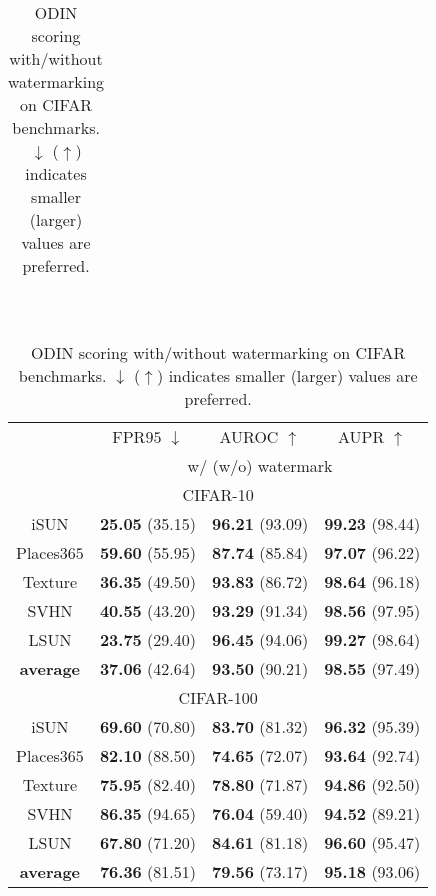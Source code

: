 \documentclass{article}
\begin{document}
\begin{table}[t]
{{\begin{tabular}{c|ccc}
\end{tabular}
}}~~~~
\parbox{.47\linewidth}{
\centering
\caption{ODIN scoring with/without watermarking on CIFAR benchmarks. $\downarrow$ ($\uparrow$) indicates smaller (larger) values are preferred.} \label{tab: odin}
\vspace{5pt}
\scriptsize{
\begin{tabular}{c|ccc}
\toprule[1.5pt]
                   & FPR$95$ $\downarrow$     & AUROC $\uparrow$       & AUPR $\uparrow$      \\
                   \cline{2-4} 
\multirow{-2}{*}{} & \multicolumn{3}{c}{w/ (w/o) watermark} \\
\midrule[0.6pt]
\multicolumn{4}{c}{\cellcolor{greyL}CIFAR-10} \\
\midrule[0.6pt]
iSUN               & \textbf{25.05} (35.15) & \textbf{96.21} (93.09) & \textbf{99.23} (98.44) \\ 
Places$365$        & \textbf{59.60} (55.95) & \textbf{87.74} (85.84) & \textbf{97.07} (96.22) \\ 
Texture            & \textbf{36.35} (49.50) & \textbf{93.83} (86.72) & \textbf{98.64} (96.18) \\ 
SVHN               & \textbf{40.55} (43.20) & \textbf{93.29} (91.34) & \textbf{98.56} (97.95) \\ 
LSUN             & \textbf{23.75} (29.40) & \textbf{96.45} (94.06) & \textbf{99.27} (98.64) \\ 
\midrule
\textbf{average}   & \textbf{37.06} (42.64) & \textbf{93.50} (90.21) & \textbf{98.55} (97.49) \\  \midrule[1pt]
\multicolumn{4}{c}{\cellcolor{greyL}CIFAR-100} \\
\midrule[1pt]
iSUN               & \textbf{69.60} (70.80) & \textbf{83.70} (81.32) & \textbf{96.32} (95.39) \\ 
Places$365$        & \textbf{82.10} (88.50) & \textbf{74.65} (72.07) & \textbf{93.64} (92.74) \\ 
Texture            & \textbf{75.95} (82.40) & \textbf{78.80} (71.87) & \textbf{94.86} (92.50) \\ 
SVHN               & \textbf{86.35} (94.65) & \textbf{76.04} (59.40) & \textbf{94.52} (89.21) \\ 
LSUN               & \textbf{67.80} (71.20) & \textbf{84.61} (81.18) & \textbf{96.60} (95.47) \\ 
\midrule
\textbf{average}   & \textbf{76.36} (81.51) & \textbf{79.56} (73.17) & \textbf{95.18} (93.06) \\  \bottomrule[1.5pt]      
\end{tabular}
}}
\end{table}
\end{document}
